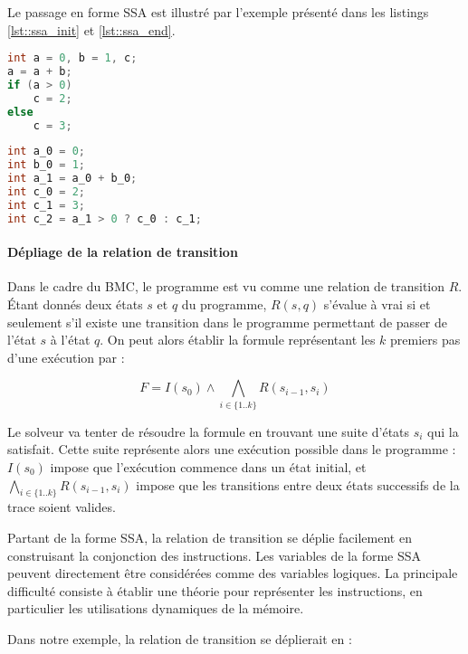 Le passage en forme \ac{SSA} est illustré par l'exemple présenté dans les
listings \ref{lst::ssa_init} et \ref{lst::ssa_end}.

\noindent\begin{minipage}{.45\textwidth}
\begin{lstlisting}[language=C, caption=Code initial, frame=tlrb, label=lst::ssa_init]
int a = 0, b = 1, c;
a = a + b;
if (a > 0)
    c = 2;
else
    c = 3;
\end{lstlisting}
\end{minipage}\hfill
\begin{minipage}{.45\textwidth}
\begin{lstlisting}[language=C, caption=Forme SSA,frame=tlrb, label=lst::ssa_end]
int a_0 = 0;
int b_0 = 1;
int a_1 = a_0 + b_0;
int c_0 = 2;
int c_1 = 3;
int c_2 = a_1 > 0 ? c_0 : c_1;
\end{lstlisting}
\end{minipage}

\paragraph{Dépliage de la relation de transition}
Dans le cadre du \ac{BMC}, le programme est vu comme une relation de transition
\(R\). Étant donnés deux états \(s\) et \(q\) du programme, \(R(s, q)\) s'évalue
à vrai si et seulement s’il existe une transition dans le programme permettant
de passer de l'état \(s\) à l'état \(q\). On peut alors établir la formule
représentant les \(k\) premiers pas d'une exécution par :

\[
F = I(s_0) \land \bigwedge_{i\in \{1..k\}} R(s_{i-1}, s_i)
\]

Le solveur va tenter de résoudre la formule en trouvant une suite d'états
\(s_i\) qui la satisfait. Cette suite représente alors une exécution possible
dans le programme : \(I(s_0)\) impose que l'exécution commence dans un état
initial, et \(\bigwedge_{i\in \{1..k\}} R(s_{i-1}, s_i)\) impose que les
transitions entre deux états successifs de la trace soient valides.

Partant de la forme \ac{SSA}, la relation de transition se déplie facilement
en construisant la conjonction des instructions. Les variables de la forme \ac{SSA}
peuvent directement être considérées comme des variables logiques. La principale
difficulté consiste à établir une théorie pour représenter les
instructions, en particulier les utilisations dynamiques de la mémoire.

Dans notre exemple, la relation de transition se déplierait en :

